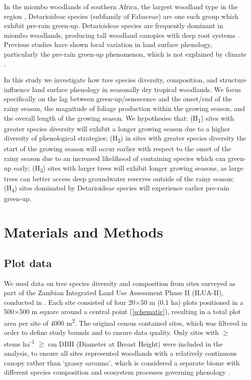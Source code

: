 \documentclass[11pt,a4paper]{article}
\begin{document}
In the miombo woodlands of southern Africa, the largest woodland type in the
region \citep{White1983}, Detarioideae species (subfamily of Fabaceae) are one
such group which exhibit pre-rain green-up. Detarioideae species are frequently
dominant in miombo woodlands, producing tall woodland canopies with deep root
systems \citep{Zhou2020}. Previous studies have shown local variation in land
surface phenology, particularly the pre-rain green-up phenomenon, which is not
explained by climate \citep{Zhou2020}.

In this study we investigate how tree species diversity, composition, and
structure influence land surface phenology in seasonally dry tropical
woodlands. We focus specifically on the lag between green-up/senescence and the
onset/end of the rainy season, the magnitude of foliage production within the
growing season, and the overall length of the growing season. We hypothesise
that: (H\textsubscript{1}) sites with greater species diversity will exhibit a
longer growing season due to a higher diversity of phenological strategies;
(H\textsubscript{2}) in sites with greater species diversity the start of the
growing season will occur earlier with respect to the onset of the rainy season
due to an increased likelihood of containing species which can green-up early;
(H\textsubscript{3}) sites with larger trees will exhibit longer growing
seasons, as large trees can better access deep groundwater reserves outside of
the rainy season; (H\textsubscript{4}) sites dominated by Detarioideae species
will experience earlier pre-rain green-up. 

\section{Materials and Methods}

\subsection{Plot data}

We used data on tree species diversity and composition from \nSites{} sites
surveyed as part of the Zambian Integrated Land Use Assessment Phase II
(ILUA-II), conducted in \censusDate{} \citep{Mukosha2009, Pelletier2018}. Each
site consisted of four 20$\times$50 m (0.1 ha) plots positioned in a
500$\times$500 m square around a central point (\autoref{schematic}), resulting
in a total plot area per site of 4000 m\textsuperscript{2}. The original census
contained \nTotalSites{} sites, which was filtered in order to define study
bounds and to ensure data quality. Only sites with $\geq$\treesHa{} stems
ha\textsuperscript{-1} $\geq$\stemSize{} cm DBH (Diameter at Breast Height)
were included in the analysis, to ensure all sites represented woodlands with a
relatively continuous canopy rather than `grassy savanna', which is considered
a separate biome with different species composition and ecosystem processes
governing phenology \citep{Parr2014}. 
\end{document}
